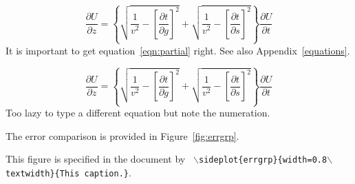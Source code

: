 \documentclass{georeport}
\begin{document}
\begin{equation}
\frac{\partial U}{\partial z} = 
\left\{
  \sqrt{\frac{1}{v^2} - \left[\frac{\partial t}{\partial g}\right]^2} +
  \sqrt{\frac{1}{v^2} - \left[\frac{\partial t}{\partial s}\right]^2}
\right\}
\frac{\partial U}{\partial t}
\label{eqn:partial}
\end{equation}
It is important to get equation~\ref{eqn:partial} right. See also
Appendix~\ref{equations}.


\begin{equation}
\frac{\partial U}{\partial z} = 
\left\{
  \sqrt{\frac{1}{v^2} - \left[\frac{\partial t}{\partial g}\right]^2} +
  \sqrt{\frac{1}{v^2} - \left[\frac{\partial t}{\partial s}\right]^2}
\right\}
\frac{\partial U}{\partial t}
\label{eqn:partial2}
\end{equation}
Too lazy to type a different equation but note the numeration.

The error comparison is provided in Figure~\ref{fig:errgrp}.

{This figure is specified in the document by \texttt{
    $\backslash$sideplot\{errgrp\}\{width=0.8$\backslash$text\-width\}\{This caption.\}}.
}







\newpage


\end{document}
